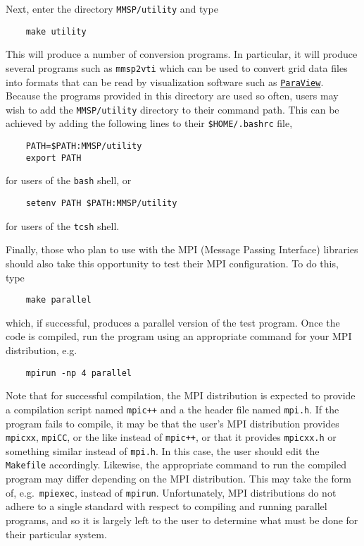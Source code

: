 Next, enter the directory {\tt MMSP/utility} and type
\begin{shadebox}
\begin{verbatim}
    make utility
\end{verbatim}
\end{shadebox}
This will produce a number of conversion programs.  In particular, it will produce several programs such as {\tt mmsp2vti} which can be used to convert \MMSP grid data files into formats that can be read by visualization software such as \href{http://www.paraview.org}{\tt ParaView}.  Because the programs provided in this directory are used so often, \MMSP users may wish to add the {\tt MMSP/utility} directory to their command path.  This can be achieved by adding the following lines to their {\tt \$HOME/.bashrc} file,
\begin{shadebox}
\begin{verbatim}
    PATH=$PATH:MMSP/utility
    export PATH
\end{verbatim}
\end{shadebox}
for users of the {\tt bash} shell, or
\begin{shadebox}
\begin{verbatim}
    setenv PATH $PATH:MMSP/utility
\end{verbatim}
\end{shadebox}
for users of the {\tt tcsh} shell.

Finally, those who plan to use \MMSP with the MPI (Message Passing Interface) libraries should also take this opportunity to test their MPI configuration.  To do this, type
\begin{shadebox}
\begin{verbatim}
    make parallel
\end{verbatim}
\end{shadebox}
which, if successful, produces a parallel version of the test program.  Once the code is compiled, run the program using an appropriate command for your MPI distribution, e.g.\
\begin{shadebox}
\begin{verbatim}
    mpirun -np 4 parallel
\end{verbatim}
\end{shadebox}
Note that for successful compilation, the MPI distribution is expected to provide a compilation script named {\tt mpic++} and a the header file named {\tt mpi.h}.  If the program fails to compile, it may be that the user's MPI distribution provides {\tt mpicxx}, {\tt mpiCC}, or the like instead of {\tt mpic++}, or that it provides {\tt mpicxx.h} or something similar instead of {\tt mpi.h}.  In this case, the user should edit the {\tt Makefile} accordingly.  Likewise, the appropriate command to run the compiled program may differ depending on the MPI distribution.  This may take the form of, e.g.\ {\tt mpiexec}, instead of {\tt mpirun}.  Unfortunately, MPI distributions do not adhere to a single standard with respect to compiling and running parallel programs, and so it is largely left to the user to determine what must be done for their particular system.

